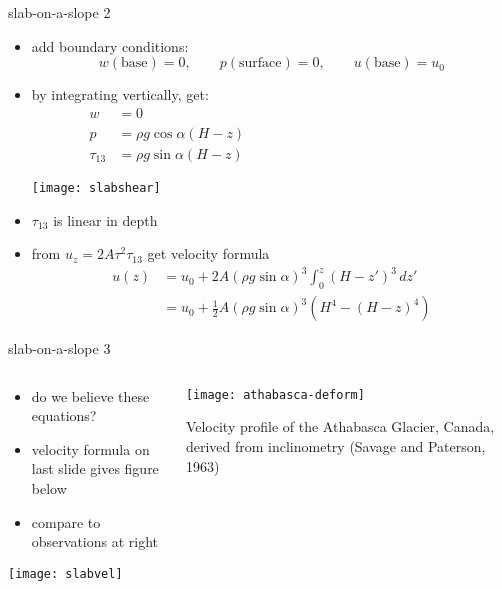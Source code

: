 \begin{frame}{slab-on-a-slope 2}

\begin{itemize}
\item add boundary conditions:
	$$w(\text{base})=0, \qquad p(\text{surface})=0, \qquad u(\text{base})=u_0$$
\item by integrating vertically, get:
\begin{align*}
w &= 0 \phantom{asdfklj asldkfjalk asdfkj sdlfkj sldafkj adlfjl sdfakj }\\
p &= \rho g \cos\alpha (H-z) \\
\tau_{13} &= \rho g \sin\alpha (H-z)
\end{align*}

\vspace{-25mm}
\hfill \texttt{[image: slabshear]}

\vspace{-7mm}
\item $\tau_{13}$ is linear in depth

\medskip
\item from $u_z = 2 A \tau^2 \tau_{13}$ get \alert{velocity formula}
\vspace{-0.05in}
\begin{align*}
u(z) &= u_0 + 2 A (\rho g \sin\alpha)^3 \int_0^z (H-z')^3\,dz' \\
     &= u_0 + \frac{1}{2} A (\rho g \sin\alpha)^3  \left(H^4 - (H-z)^4\right)
\end{align*}
\end{itemize}
\end{frame}


\begin{frame}{slab-on-a-slope 3}

\begin{columns}
\begin{column}{0.6\textwidth}
\begin{itemize}
\item do we believe these equations?
\item velocity formula on last slide gives figure below
\item compare to observations at right
\end{itemize}
\begin{center}
\texttt{[image: slabvel]}
\end{center}
\end{column}

\begin{column}{0.4\textwidth}
\texttt{[image: athabasca-deform]}

\medskip
\scriptsize
Velocity profile of the Athabasca Glacier, Canada, derived from inclinometry (Savage and Paterson, 1963)
\end{column}
\end{columns}
\end{frame}


